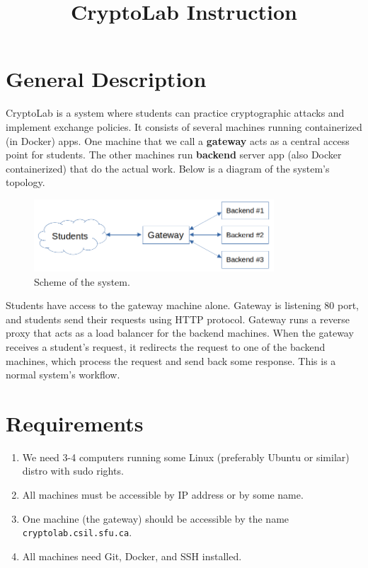 \documentclass{article}
\title{CryptoLab Instruction}
\author{}
\begin{document}
\maketitle

\section{General Description}

CryptoLab is a system where students can practice cryptographic attacks and implement exchange policies. It consists of several machines running containerized (in Docker) apps. One machine that we call a \textbf{gateway} acts as a central access point for students. The other machines run \textbf{backend} server app (also Docker containerized) that do the actual work. Below is a diagram of the system's topology.

\begin{figure}[h]
    \centering
    \includegraphics[width=0.8\textwidth]{scheme}
    \caption{Scheme of the system.}
\end{figure}

Students have access to the gateway machine alone. Gateway is listening 80 port, and students send their requests using HTTP protocol. Gateway runs a reverse proxy that acts as a load balancer for the backend machines. When the gateway receives a student's request, it redirects the request to one of the backend machines, which process the request and send back some response. This is a normal system's workflow. 

\section{Requirements}
\begin{enumerate}
    \item We need 3-4 computers running some Linux (preferably Ubuntu or similar) distro with sudo rights. 
    \item All machines must be accessible by IP address or by some name.
    \item One machine (the gateway) should be accessible by the name \texttt{cryptolab.csil.sfu.ca}. 
    \item All machines need Git, Docker, and SSH installed.
\end{enumerate}
\end{document}
